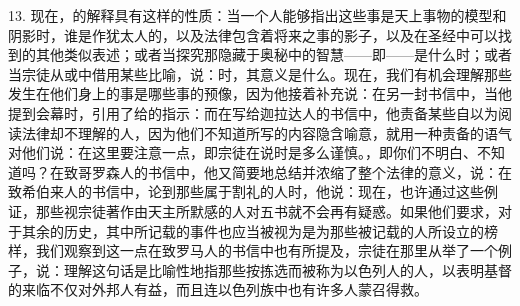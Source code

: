 13. 现在，的解释具有这样的性质：当一个人能够指出这些事是天上事物的模型和阴影时，谁是作犹太人的，以及法律包含着将来之事的影子，以及在圣经中可以找到的其他类似表述；或者当探究那隐藏于奥秘中的智慧——即——是什么时；或者当宗徒从或中借用某些比喻，说：时，其意义是什么。现在，我们有机会理解那些发生在他们身上的事是哪些事的预像，因为他接着补充说：在另一封书信中，当他提到会幕时，引用了给的指示：而在写给迦拉达人的书信中，他责备某些自以为阅读法律却不理解的人，因为他们不知道所写的内容隐含喻意，就用一种责备的语气对他们说：在这里要注意一点，即宗徒在说时是多么谨慎。，即你们不明白、不知道吗？在致哥罗森人的书信中，他又简要地总结并浓缩了整个法律的意义，说：在致希伯来人的书信中，论到那些属于割礼的人时，他说：现在，也许通过这些例证，那些视宗徒著作由天主所默感的人对五书就不会再有疑惑。如果他们要求，对于其余的历史，其中所记载的事件也应当被视为是为那些被记载的人所设立的榜样，我们观察到这一点在致罗马人的书信中也有所提及，宗徒在那里从举了一个例子，说：理解这句话是比喻性地指那些按拣选而被称为以色列人的人，以表明基督的来临不仅对外邦人有益，而且连以色列族中也有许多人蒙召得救。\par

